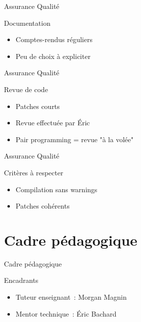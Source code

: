 \documentclass[handout]{beamer}
\begin{document}
\begin{frame}{Assurance Qualité}
    \begin{block}{Documentation}
        \begin{itemize}[<+->]
            \item Comptes-rendus réguliers
            \item Peu de choix à expliciter
        \end{itemize}
    \end{block}
\end{frame}

\begin{frame}{Assurance Qualité}
    \begin{block}{Revue de code}
        \begin{itemize}[<+->]
            \item Patches courts
            \item Revue effectuée par Éric
            \item Pair programming = revue "à la volée"
        \end{itemize}
    \end{block}
\end{frame}

\begin{frame}{Assurance Qualité}
    \begin{block}{Critères à respecter}
        \begin{itemize}[<+->]
            \item Compilation sans warnings
            \item Patches cohérents
        \end{itemize}
    \end{block}
\end{frame}

\section{Cadre pédagogique}

\begin{frame}{Cadre pédagogique}
    \begin{block}{Encadrants}
        \begin{itemize}[<+->]
            \item Tuteur enseignant~: Morgan Magnin
            \item Mentor technique~: Éric Bachard
        \end{itemize}
    \end{block}
\end{frame}
\end{document}
